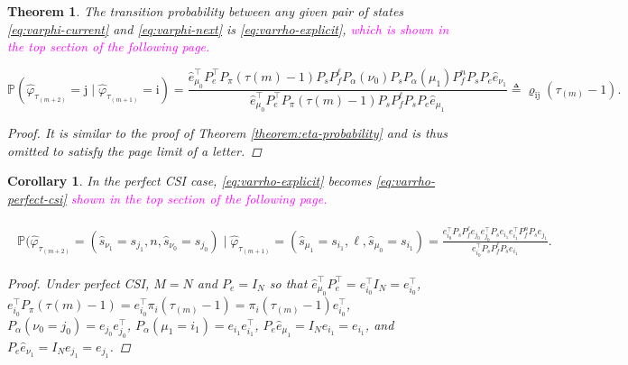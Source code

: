 \documentclass[journal,twoside,web]{ieeecolor}
\newtheorem{theorem}{Theorem}
\newtheorem{corollary}{Corollary}[theorem]
\begin{document}
\begin{theorem}\label{theorem:varphi-probability}
    The transition probability between any given pair of states \eqref{eq:varphi-current} and \eqref{eq:varphi-next} is \eqref{eq:varrho-explicit}, \textcolor{magenta}{which is shown in the top section of the following page.}

\begin{figure*}[ht]
\raggedright
\begin{equation}\label{eq:varrho-explicit}
\mathbb{P}(
\hat{\varphi}_{\tau_{(m+2)}}^{} = \mathrm{j} \mid \hat{\varphi}_{\tau_{(m+1)}}^{} = \mathrm{i}) = 
\frac{\hat{e}_{\mu_0}^{\top} P_{e}^{\top} P_{\pi}(\tau{(m)}-1) P_{s} P_{f}^{\ell} P_{\alpha}(\nu_0) P_{s} P_{\alpha}(\mu_1) P_{f}^{n} P_{s} P_{e}\hat{e}_{\nu_1}}{\hat{e}_{\mu_0}^{\top} P_{e}^{\top} P_{\pi}(\tau{(m)}-1) P_{s} P_{f}^{\ell} P_{s} P_{e}\hat{e}_{\mu_1}} 
\triangleq 
\varrho_{\mathrm{i}\mathrm{j}}(\tau_{(m)}-1).
\end{equation}
\end{figure*}

\begin{proof}
    It is similar to the proof of Theorem \ref{theorem:eta-probability} and is thus omitted to satisfy the page limit of a letter.
\end{proof}
\end{theorem}
\begin{corollary}\label{corollary:varrho}
In the \emph{perfect CSI} case, \eqref{eq:varrho-explicit} becomes \eqref{eq:varrho-perfect-csi} \textcolor{magenta}{shown in the top section of the following page.}

\begin{figure*}[ht]
\raggedright
\begin{align}\label{eq:varrho-perfect-csi}
    \begin{aligned}
    \mathbb{P}(
    \hat{\varphi}_{\tau_{(m+2)}}^{} = (\hat{s}_{\nu_{1}} = s_{j_1},n,\hat{s}_{\nu_{0}} = s_{j_0}) \mid 
    \hat{\varphi}_{\tau_{(m+1)}}^{} = (\hat{s}_{\mu_{1}} = s_{i_1},\ell,\hat{s}_{\mu_{0}}= s_{i_1}) = \frac{e_{i_0}^{\top} P_{s} P_{f}^{\ell} e_{j_0}e_{j_0}^{\top} P_{s} e_{i_1}e_{i_1}^{\top} P_{f}^{n}P_{s} e_{j_1}}{e_{i_0}^{\top} P_{s}P_{f}^{\ell}P_{s}e_{i_1}}.
    \end{aligned}
\end{align}
\end{figure*}
\begin{proof}
    Under perfect CSI, $M=N$ and $P_e = I_{N}$ so that $\hat{e}_{\mu_0}^{\top} P_{e}^{\top} = e_{i_0}^{\top} I_{N} = e_{i_0}^{\top}$, $e_{i_0}^{\top} P_{\pi}(\tau{(m)}-1)=e_{i_0}^{\top}\pi_{i}(\tau_{(m)}-1)=\pi_{i}(\tau_{(m)}-1)e_{i_0}^{\top}$, $P_{\alpha}(\nu_0=j_0)=e_{j_0}e_{j_0}^{\top}$, $P_{\alpha}(\mu_1=i_1)=e_{i_1}e_{i_1}^{\top}$, $P_{e}\hat{e}_{\mu_1} = I_{N} e_{i_1}  = e_{i_1}$, and $P_{e}\hat{e}_{\nu_1} = I_{N} e_{j_1}  = e_{j_1}$.
\end{proof}
\end{corollary}
\end{document}
